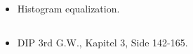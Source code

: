 \subsection{\subtopics}

\begin{itemize}
	\item Histogram equalization.
\end{itemize}

\subsection{\curriculum}

\begin{itemize}
	\item DIP 3rd G.W., Kapitel 3, Side 142-165.
\end{itemize}